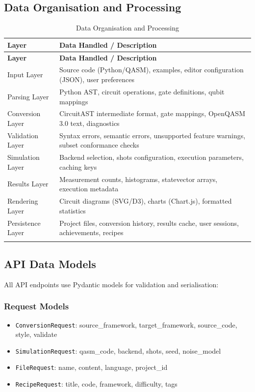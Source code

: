 \subsection{Data Organisation and Processing}

\begin{longtable}{>{\raggedright\arraybackslash}p{} >{\raggedright\arraybackslash}p{}}
\toprule
\textbf{Layer} & \textbf{Data Handled / Description} \\
\midrule
\endfirsthead
\toprule
\textbf{Layer} & \textbf{Data Handled / Description} \\
\midrule
\endhead
Input Layer & Source code (Python/QASM), examples, editor configuration (JSON), user preferences \\
\addlinespace
Parsing Layer & Python AST, circuit operations, gate definitions, qubit mappings \\
\addlinespace
Conversion Layer & CircuitAST intermediate format, gate mappings, OpenQASM 3.0 text, diagnostics \\
\addlinespace
Validation Layer & Syntax errors, semantic errors, unsupported feature warnings, subset conformance checks \\
\addlinespace
Simulation Layer & Backend selection, shots configuration, execution parameters, caching keys \\
\addlinespace
Results Layer & Measurement counts, histograms, statevector arrays, execution metadata \\
\addlinespace
Rendering Layer & Circuit diagrams (SVG/D3), charts (Chart.js), formatted statistics \\
\addlinespace
Persistence Layer & Project files, conversion history, results cache, user sessions, achievements, recipes \\
\bottomrule
\caption{Data Organisation and Processing}
\label{tab:data-organization}
\end{longtable}

\subsection{API Data Models}

All API endpoints use Pydantic models for validation and serialisation:

\subsubsection{Request Models}
\begin{itemize}
    \item \texttt{ConversionRequest}: source\_framework, target\_framework, source\_code, style, validate
    \item \texttt{SimulationRequest}: qasm\_code, backend, shots, seed, noise\_model
    \item \texttt{FileRequest}: name, content, language, project\_id
    \item \texttt{RecipeRequest}: title, code, framework, difficulty, tags
\end{itemize}

